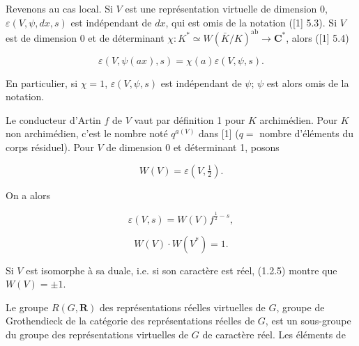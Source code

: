 \documentclass[9pt,twoside]{extarticle}
\begin{document}
{Revenons au cas local. Si \(V\) est une représentation virtuelle de dimension 0, \(\varepsilon(V,\psi,dx,s)\) est indépendant de \(dx\), qui est omis de la notation ([1] 5.3). Si \(V\) est de dimension 0 et de déterminant \(\chi:K^*\simeq W(\bar K/K)^{\mathrm{ab}}\to\mathbf C^*\), alors ([1] 5.4)\par

\[
\tag{1.2.2} \varepsilon(V,\psi(ax),s)=\chi(a)\varepsilon(V,\psi,s).
\]

En particulier, si \(\chi=1\), \(\varepsilon(V,\psi,s)\) est indépendant de \(\psi\); \(\psi\) est alors omis de la notation.\par

Le conducteur d’Artin \(f\) de \(V\) vaut par définition 1 pour \(K\) archimédien. Pour \(K\) non archimédien, c’est le nombre noté \(q^{a(V)}\) dans [1] (\(q=\) nombre d’éléments du corps résiduel). Pour \(V\) de dimension 0 et déterminant 1, posons\par

\[
\tag{1.2.3} W(V)=\varepsilon\!\left(V,\tfrac12\right).
\]

On a alors\par

\[
\tag{1.2.4} \varepsilon(V,s)=W(V)f^{\frac12-s},
\]

\[
\tag{1.2.5} W(V)\cdot W(V^*)=1.
\]

Si \(V\) est isomorphe à sa duale, i.e. si son caractère est réel, (1.2.5) montre que \(W(V)=\pm1\).\par

Le groupe \(R(G,\mathbf R)\) des représentations réelles virtuelles de \(G\), groupe de Grothendieck de la catégorie des représentations réelles de \(G\), est un sous-groupe du groupe des représentations virtuelles de \(G\) de caractère réel. Les éléments de\par
}
\end{document}
